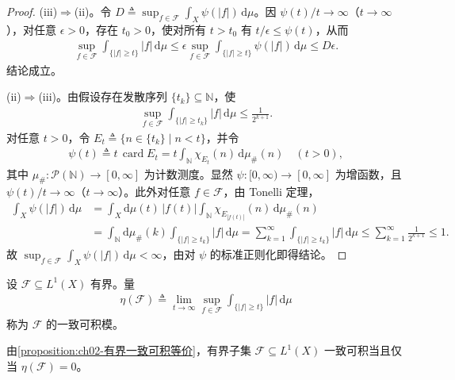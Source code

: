 \documentclass[../../main.tex]{subfiles}%
\begin{document}
\begin{proof}
(iii)$\Rightarrow$(ii)。令 $D\triangleq \sup_{f\in\mathscr F}\int_X\psi(|f|)\,\mathrm{d}\mu$。因 $\psi(t)/t\to\infty$（$t\to\infty$），对任意 $\epsilon>0$，存在 $t_0>0$，使对所有 $t>t_0$ 有 $t/\epsilon\leqslant\psi(t)$，从而
\begin{align*}
\sup_{f\in\mathscr F}\int_{\{|f|\geqslant t\}}|f|\,\mathrm{d}\mu
\leqslant\epsilon\sup_{f\in\mathscr F}\int_{\{|f|\geqslant t\}}\psi(|f|)\,\mathrm{d}\mu\leqslant D\epsilon.
\end{align*}
结论成立。

(ii)$\Rightarrow$(iii)。由假设存在发散序列 $\{t_k\}\subseteq\mathbb N$，使
\begin{align*}
\sup_{f\in\mathscr F}\int_{\{|f|\geqslant t_k\}}|f|\,\mathrm{d}\mu\leqslant\frac1{2^{k+1}}.
\end{align*}
对任意 $t>0$，令 $E_t\triangleq \{n\in\{t_k\}\mid n<t\}$，并令
\begin{align*}
\psi(t)\triangleq t\,\operatorname{card}E_t=t\int_{\mathbb N}\chi_{E_t}(n)\,\mathrm{d}\mu_\#(n)\quad(t>0),
\end{align*}
其中 $\mu_\#:\mathscr P(\mathbb N)\to[0,\infty]$ 为计数测度。显然 $\psi:[0,\infty)\to[0,\infty]$ 为增函数，且 $\psi(t)/t\to\infty$（$t\to\infty$）。此外对任意 $f\in\mathscr F$，由 Tonelli 定理，
\begin{align*}
\int_X\psi(|f|)\,\mathrm{d}\mu
&=\int_X\mathrm{d}\mu(t)\,|f(t)|\int_{\mathbb N}\chi_{E_{|f(t)|}}(n)\,\mathrm{d}\mu_\#(n)\\
&=\int_{\mathbb N}\mathrm{d}\mu_\#(k)\int_{\{|f|\geqslant t_k\}}|f|\,\mathrm{d}\mu
=\sum_{k=1}^\infty\int_{\{|f|\geqslant t_k\}}|f|\,\mathrm{d}\mu
\leqslant\sum_{k=1}^\infty\frac1{2^{k+1}}\leqslant1.
\end{align*}
故 $\sup_{f\in\mathscr F}\int_X\psi(|f|)\,\mathrm{d}\mu<\infty$，由对 $\psi$ 的标准正则化即得结论。
\end{proof}

\begin{definition}\label{definition:ch02-一致可积模}
设 $\mathscr F\subseteq L^1(X)$ 有界。量
\begin{align}
\eta(\mathscr F)\triangleq \lim_{t\to\infty}\sup_{f\in\mathscr F}\int_{\{|f|\geqslant t\}}|f|\,\mathrm{d}\mu \label{align:ch02-2.62}
\end{align}
称为 $\mathscr F$ 的一致可积模。
\end{definition}

\begin{remark}\label{remark:ch02-模零一致可积}
由\cref{proposition:ch02-有界一致可积等价}，有界子集 $\mathscr F\subseteq L^1(X)$ 一致可积当且仅当 $\eta(\mathscr F)=0$。
\end{remark}
\end{document}
